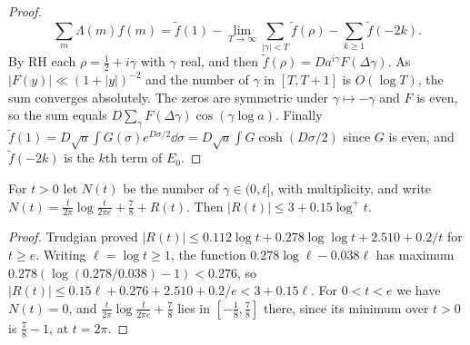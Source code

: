 \documentclass[11pt,colorlinks]{charlie}
\begin{document}
\begin{proof}
\[
 \sum_m\Lambda(m)f(m)=\tilde f(1)-\lim_{T\to\infty}\sum_{|\gamma|<T}\tilde f(\rho)-\sum_{k\ge1}\tilde f(-2k).
\]
By RH \cite{Alpoge} each $\rho=\frac12+i\gamma$ with $\gamma$ real, and then $\tilde f(\rho)=Da^{i\gamma}F(\Delta\gamma)$. As $|F(y)|\ll(1+|y|)^{-2}$ and the number of $\gamma$ in $[T,T+1]$ is $O(\log T)$, the sum converges absolutely. The zeros are symmetric under $\gamma\mapsto-\gamma$ and $F$ is even, so the sum equals $D\sum_\gamma F(\Delta\gamma)\cos(\gamma\log a)$. Finally $\tilde f(1)=D\sqrt a\int G(\sigma)e^{D\sigma/2}\dd\sigma=D\sqrt a\int G\cosh(D\sigma/2)$ since $G$ is even, and $\tilde f(-2k)$ is the $k$th term of $E_0$.
\end{proof}

\begin{lemma}\label{lem:Nt}
For $t>0$ let $N(t)$ be the number of $\gamma\in(0,t]$, with multiplicity, and write $N(t)=\frac t{2\pi}\log\frac t{2\pi e}+\frac78+R(t)$. Then $|R(t)|\le3+0.15\log^+t$.
\end{lemma}
\begin{proof}
Trudgian \cite[Cor.~1]{Trudgian} proved $|R(t)|\le0.112\log t+0.278\log\log t+2.510+0.2/t$ for $t\ge e$. Writing $\ell=\log t\ge1$, the function $0.278\log\ell-0.038\ell$ has maximum $0.278(\log(0.278/0.038)-1)<0.276$, so $|R(t)|\le0.15\ell+0.276+2.510+0.2/e<3+0.15\ell$. For $0<t<e$ we have $N(t)=0$, and $\frac t{2\pi}\log\frac t{2\pi e}+\frac78$ lies in $[-\frac18,\frac78]$ there, since its minimum over $t>0$ is $\frac78-1$, at $t=2\pi$.
\end{proof}
\end{document}
